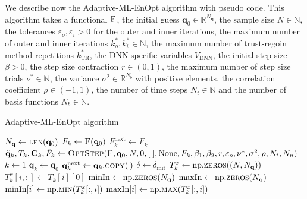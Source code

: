 We describe now the Adaptive-ML-EnOpt algorithm with pseudo code. This algorithm takes a functional $\textproc{F}$, the initial guess $\mathbf{q}_0\in\mathbb{R}^{N_\mathbf{q}}$, the sample size $N\in\mathbb{N}$, the tolerances $\varepsilon_o,\varepsilon_i>0$ for the outer and inner iterations, the maximum number of outer and inner iterations $k_o^*,k_i^*\in\mathbb{N}$, the maximum number of trust-regoin method repetitions $k^*_\mathrm{TR}$, the DNN-specific variables $V_{\mathrm{DNN}}$, the initial step size $\beta>0$, the step size contraction $r\in(0,1)$, the maximum number of step size trials $\nu^*\in\mathbb{N}$, the variance $\sigma^2\in\mathbb{R}^{N_b}$ with positive elements, the correlation coefficient $\rho\in(-1,1)$, the number of time steps $N_t\in\mathbb{N}$ and the number of basis functions $N_b\in\mathbb{N}$.
\begin{algorithm}[H]%
\caption{\label{AML-EnOpt}Adaptive-ML-EnOpt algorithm}
\begin{algorithmic}[1]
\State $N_\mathbf{q}\gets\Call{len}{\mathbf{q}_0}$
\State\label{AMLFOMEval1} $F_k\gets \Call{F}{\mathbf{q}_0}$
\State $F^\mathrm{next}_k \gets F_k$
\State\label{FOMOptStepAML1} $\tilde{\mathbf{q}}_k,T_k,\mathbf{C}_k,\tilde{F}_k\gets\Call{OptStep}{\textproc{F}, \mathbf{q}_0, N, 0, [\;], \mathrm{None}, F_k, \beta_1, \beta_2, r, \varepsilon_o, \nu^*, \sigma^2, \rho, N_t, N_n}$
\State $k\gets 1$
\State $\mathbf{q}_k \gets \mathbf{q}_0$
\State $\mathbf{q}^\mathrm{next}_k \gets \mathbf{q}_k.\Call{copy}{\:}$
\State\label{deltaInitAML} $\delta \gets \delta_\mathrm{init}$
\State\label{minMaxInAlg1} $T^x_k \gets \mathrm{np.}\Call{zeros}{(N, N_\mathbf{q})}$
\State $T^x_k[i,:] \gets T_k[i][0]$
\EndFor
\State $\mathrm{minIn} \gets \mathrm{np.}\Call{zeros}{N_\mathbf{q}}$
\State $\mathrm{maxIn} \gets \mathrm{np.}\Call{zeros}{N_\mathbf{q}}$
\State $\mathrm{minIn}[i] \gets \mathrm{np.}\Call{min}{T^x_k[:,i]}$
\State\label{minMaxInAlg2} $\mathrm{maxIn}[i] \gets \mathrm{np.}\Call{max}{T^x_k[:,i]}$
\EndFor

\end{algorithmic}
\end{algorithm}
